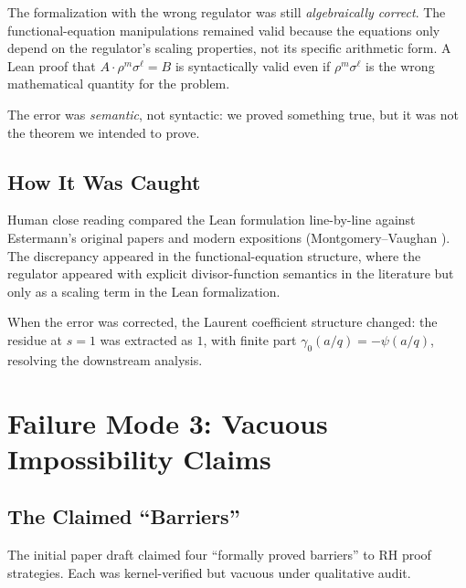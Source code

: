 \documentclass[11pt,a4paper]{article}
\theoremstyle{definition}
\theoremstyle{remark}
\begin{document}
The formalization with the wrong regulator was still \emph{algebraically correct}. The functional-equation manipulations remained valid because the equations only depend on the regulator's scaling properties, not its specific arithmetic form. A Lean proof that $A \cdot \rho^m \sigma^\ell = B$ is syntactically valid even if $\rho^m \sigma^\ell$ is the wrong mathematical quantity for the problem.

The error was \emph{semantic}, not syntactic: we proved something true, but it was not the theorem we intended to prove.

\subsection{How It Was Caught}

Human close reading compared the Lean formulation line-by-line against Estermann's original papers \cite{Estermann1928} and modern expositions (Montgomery--Vaughan \cite{MontgomeryVaughan2007}). The discrepancy appeared in the functional-equation structure, where the regulator appeared with explicit divisor-function semantics in the literature but only as a scaling term in the Lean formalization.

When the error was corrected, the Laurent coefficient structure changed: the residue at $s=1$ was extracted as $1$, with finite part $\gamma_0(a/q) = -\psi(a/q)$, resolving the downstream analysis.

\section{Failure Mode 3: Vacuous Impossibility Claims}
\label{sec:failure3}

\subsection{The Claimed ``Barriers''}

The initial paper draft claimed four ``formally proved barriers'' to RH proof strategies. Each was kernel-verified but vacuous under qualitative audit.
\end{document}
